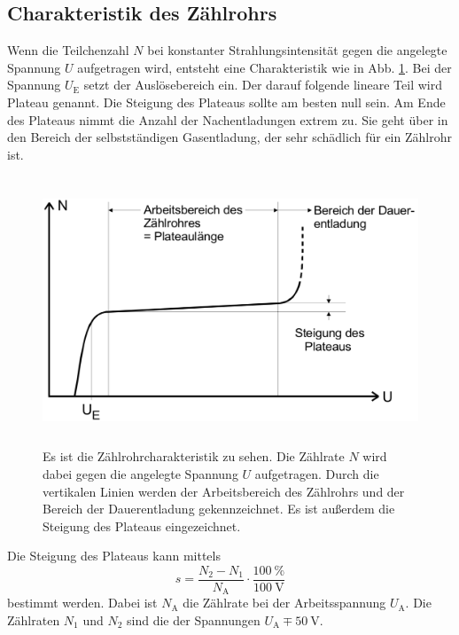 \subsection{Charakteristik des Zählrohrs}

Wenn die Teilchenzahl $N$ bei konstanter Strahlungsintensität gegen die angelegte Spannung $U$ aufgetragen wird, entsteht eine Charakteristik wie in Abb. \ref{fig:charakteristik}. Bei der Spannung $U_\text{E}$ setzt der Auslösebereich ein. Der darauf folgende lineare Teil wird Plateau genannt. Die Steigung des Plateaus sollte am besten null sein. Am Ende des Plateaus nimmt die Anzahl der Nachentladungen extrem zu. Sie geht über in den Bereich der selbstständigen Gasentladung, der sehr schädlich für ein Zählrohr ist.

\begin{figure}
    \centering
    \includegraphics[width=12cm, height=8cm]{build/charakteristik.png}
    \caption{Es ist die Zählrohrcharakteristik zu sehen. Die Zählrate $N$ wird dabei gegen die angelegte Spannung $U$ aufgetragen. Durch die vertikalen Linien werden der Arbeitsbereich des Zählrohrs und der Bereich der Dauerentladung gekennzeichnet. Es ist außerdem die Steigung des Plateaus eingezeichnet. \cite{V703}}
    \label{fig:charakteristik}
\end{figure}

\noindent Die Steigung des Plateaus kann mittels
\begin{equation}
    s = \frac{N_2 - N_1}{N_\text{A}} \cdot \frac{\SI{100}{\percent}}{\SI{100}{\volt}}
    \label{steigung}
\end{equation}
bestimmt werden. Dabei ist $N_\text{A}$ die Zählrate bei der Arbeitsspannung $U_\text{A}$. Die Zählraten $N_1$ und $N_2$ sind die der Spannungen $U_\text{A} \mp \SI{50}{\volt}$.

